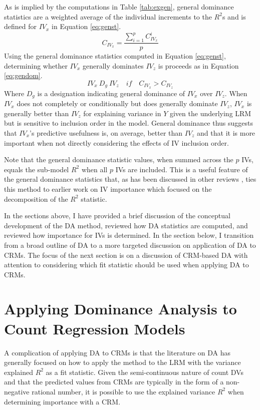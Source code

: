 \documentclass[man]{apa7}
\begin{document}
	As is implied by the computations in Table \ref{tab:exgen}, general dominance statistics are a weighted average of the individual increments to the $R^2$s and is defined for $IV_x$ in Equation \ref{eq:genst}.
	\begin{equation}
		C_{IV_x} = \frac{\sum^{p}_{i=1} C^i_{IV_x}}{p}
		\label{eq:genst}
	\end{equation}
	Using the general dominance statistics computed in Equation \ref{eq:genst}, determining whether $IV_x$ generally dominates $IV_z$ is proceeds as in Equation \ref{eq:gendom}.
	\begin{equation}
		IV_x \ D_g \ IV_z \quad if \quad C_{IV_x} > C_{IV_z}
		\label{eq:gendom}
	\end{equation}
	Where $D_g$ is a designation indicating general dominance of $IV_x$ over $IV_z$.	
	When $IV_x$ does not completely or conditionally but does generally dominate $IV_z$, $IV_x$ is generally better than $IV_z$ for explaining variance in $Y$ given the underlying LRM but is sensitive to inclusion order in the model.
	General dominance thus suggests that $IV_x$'s predictive usefulness is, on average, better than $IV_z$ and that it is more important when not directly considering the effects of IV inclusion order.
	
	Note that the general dominance statistic values, when summed across the $p$ IVs, equals the sub-model $R^2$ when all $p$ IVs are included.
	This is a useful feature of the general dominance statistics that, as has been discussed in other reviews \parencite{gromping2007estimators,johnson2004history}, ties this method to earlier work on IV importance which focused on the decomposition of the $R^2$ statistic.

	In the sections above, I have provided a brief discussion of the conceptual development of the DA method, reviewed how DA statistics are computed, and reviewed how importance for IVs is determined.
	In the section below, I transition from a broad outline of DA to a more targeted discussion on application of DA to CRMs.
	The focus of the next section is on a discussion of CRM-based DA with attention to considering which fit statistic should be used when applying DA to CRMs.
	
\section{Applying Dominance Analysis to Count Regression Models}

	A complication of applying DA to CRMs is that the literature on DA has generally focused on how to apply the method to the LRM with the variance explained $R^2$ as a fit statistic.
	Given the semi-continuous nature of count DVs and that the predicted values from CRMs are typically in the form of a non-negative rational number, it is possible to use the explained variance $R^2$ when determining importance with a CRM.
	
\end{document}

